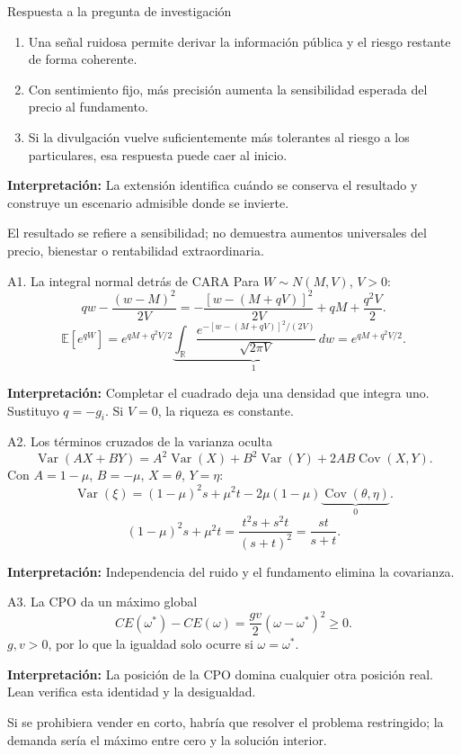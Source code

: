\documentclass[aspectratio=169,11pt]{beamer}
\newcommand{\E}{\mathbb E}
\newcommand{\Var}{\operatorname{Var}}
\newcommand{\Cov}{\operatorname{Cov}}
\newcommand{\idea}[1]{\par\medskip\textbf{Interpretación:} #1}
\begin{document}
\begin{frame}{Respuesta a la pregunta de investigación}
\begin{enumerate}
\item Una señal ruidosa permite derivar la información pública y el
riesgo restante de forma coherente.
\item Con sentimiento fijo, más precisión aumenta la sensibilidad
esperada del precio al fundamento.
\item Si la divulgación vuelve suficientemente más tolerantes al riesgo
a los particulares, esa respuesta puede caer al inicio.
\end{enumerate}
\idea{La extensión identifica cuándo se conserva el resultado y construye
un escenario admisible donde se invierte.}
\small\medskip\par
El resultado se refiere a sensibilidad; no demuestra aumentos universales
del precio, bienestar o rentabilidad extraordinaria.
\end{frame}

\appendix
\begin{frame}{A1. La integral normal detrás de CARA}
Para \(W\sim N(M,V)\), \(V>0\):
\[
 qw-\frac{(w-M)^2}{2V}
 =-\frac{[w-(M+qV)]^2}{2V}+qM+\frac{q^2V}{2}.
\]
\[
 \E[e^{qW}]
 =e^{qM+q^2V/2}
 \underbrace{\int_{\mathbb R}
 \frac{e^{-[w-(M+qV)]^2/(2V)}}{\sqrt{2\pi V}}\,dw}_{1}
 =e^{qM+q^2V/2}.
\]
\idea{Completar el cuadrado deja una densidad que integra uno.
Sustituyo \(q=-g_i\). Si \(V=0\), la riqueza es constante.}
\end{frame}

\begin{frame}{A2. Los términos cruzados de la varianza oculta}
\[
 \Var(A X+B Y)
 =A^2\Var(X)+B^2\Var(Y)+2AB\Cov(X,Y).
\]
Con \(A=1-\mu\), \(B=-\mu\), \(X=\theta\), \(Y=\eta\):
\[
 \Var(\xi)=(1-\mu)^2s+\mu^2t
 -2\mu(1-\mu)\underbrace{\Cov(\theta,\eta)}_0.
\]
\[
 (1-\mu)^2s+\mu^2t
 =\frac{t^2s+s^2t}{(s+t)^2}
 =\frac{st}{s+t}.
\]
\idea{Independencia del ruido y el fundamento elimina la covarianza.}
\end{frame}

\begin{frame}{A3. La CPO da un máximo global}
\[
 CE(\omega^*)-CE(\omega)
 =\frac{gv}{2}(\omega-\omega^*)^2\geq0.
\]
\(g,v>0\), por lo que la igualdad solo ocurre si \(\omega=\omega^*\).
\idea{La posición de la CPO domina cualquier otra posición real.
Lean verifica esta identidad y la desigualdad.}
\small\medskip\par
Si se prohibiera vender en corto, habría que resolver el problema
restringido; la demanda sería el máximo entre cero y la solución interior.
\end{frame}
\end{document}

